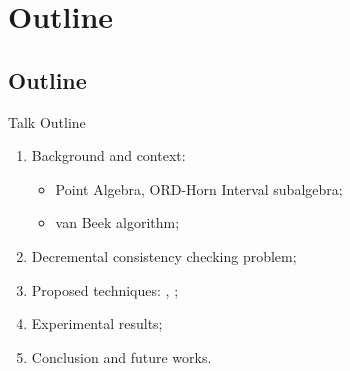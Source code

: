 \section{Outline}

\subsection{Outline}
\begin{frame}{Talk Outline}
	\begin{enumerate}
		\item Background and context:
			\begin{itemize}
				\item Point Algebra, ORD-Horn Interval subalgebra;
				\item van Beek algorithm;
			\end{itemize}
		\item Decremental consistency checking problem;
		\item Proposed techniques: \DPASAT{}, \DOHSAT{};
		\item Experimental results;
		\item Conclusion and future works.
	\end{enumerate}
\end{frame}